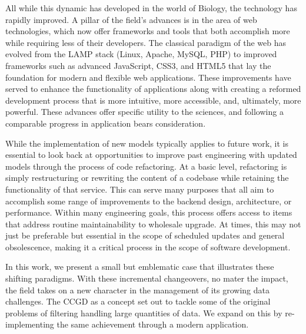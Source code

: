 \documentclass[10pt]{report}
\begin{document}
All while this dynamic has developed in the world of Biology, the technology has rapidly improved. A pillar of the field's advances is in the area of web technologies, which now offer frameworks and tools that both accomplish more while requiring less of their developers. The classical paradigm of the web has evolved from the LAMP stack (Linux, Apache, MySQL, PHP) to improved frameworks such as advanced JavaScript, CSS3, and HTML5 that lay the foundation for modern and flexible web applications. These improvements have served to enhance the functionality of applications along with creating a reformed development process that is more intuitive, more accessible, and, ultimately, more powerful. These advances offer specific utility to the sciences, and following a comparable progress in application bears consideration.

While the implementation of new models typically applies to future work, it is essential to look back at opportunities to improve past engineering with updated models through the process of code refactoring. At a basic level, refactoring is simply restructuring or rewriting the content of a codebase while retaining the functionality of that service. This can serve many purposes that all aim to accomplish some range of improvements to the backend design, architecture, or performance. Within many engineering goals, this process offers access to items that address routine maintainability to wholesale upgrade. At times, this may not just be preferable but essential in the scope of scheduled updates and general obsolescence, making it a critical process in the scope of software development.

In this work, we present a small but emblematic case that illustrates these shifting paradigms. With these incremental changeovers, no mater the impact, the field takes on a new character in the management of its growing data challenges. The CCGD as a concept set out to tackle some of the original problems of filtering handling large quantities of data. We expand on this by re-implementing the same achievement through a modern application.


\end{document}
